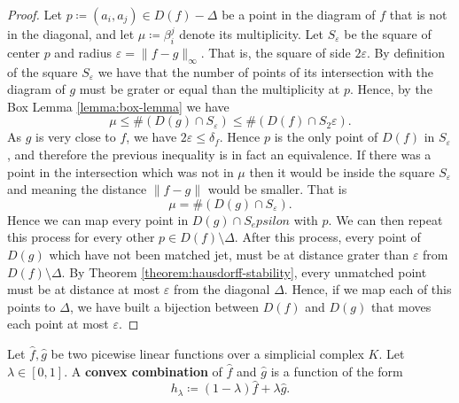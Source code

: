\begin{proof}
    Let $ p \coloneq (a_i, a_j) \in D(f) - \Delta $ be a point in the diagram of $ f $ that is not in the diagonal, and let $ \mu \coloneq \beta_i^j $ denote its multiplicity. Let $S_\varepsilon$ be the square of center $ p $ and radius $\varepsilon = \| f- g \|_\infty $. That is, the square of side $ 2 \varepsilon $. By definition of the square $ S_\varepsilon $ we have that the number of points of its intersection with the diagram of $ g $ must be grater or equal than the multiplicity at $ p $. Hence, by the Box Lemma \ref{lemma:box-lemma} we have
    $$
        \mu \leq \# (D(g) \cap S_\varepsilon) \leq \#(D(f) \cap S_2\varepsilon).
    $$
    As $ g $ is very close to $ f $, we have $ 2\varepsilon \leq \delta_f $. Hence $ p $ is the only point of $ D(f) $ in $ S_\varepsilon$, and therefore the previous inequality is in fact an equivalence. If there was a point in the intersection which was not in $\mu $ then it would be inside the square $ S_\varepsilon $ and meaning the distance $\| f - g \| $ would be smaller. That is
    $$
        \mu = \# (D(g) \cap S_\varepsilon).
    $$
    Hence we can map every point in $ D(g) \cap S_epsilon $ with $ p $. We can then repeat this process for every other $ p \in D(f) \setminus \Delta $. After this process, every point of $ D(g) $ which have not been matched jet, must be at distance grater than $ \varepsilon $ from $ D(f) \setminus \Delta $. By Theorem \ref{theorem:hausdorff-stability}, every unmatched point must be at distance at most $ \varepsilon $ from the diagonal $ \Delta $. Hence, if we map each of this points to $ \Delta $, we have built a bijection between $ D(f) $ and $ D(g) $ that moves each point at most $ \varepsilon $.
\end{proof}

\begin{definition}
    Let $\hat f, \hat g $ be two picewise linear functions over a simplicial complex $ K $. Let $ \lambda \in [0, 1] $. A {\bf convex combination} of $ \hat f $ and $ \hat g $ is a function of the form
    $$
        h_\lambda \coloneq (1-\lambda) \hat f + \lambda \hat g.
    $$
\end{definition}

